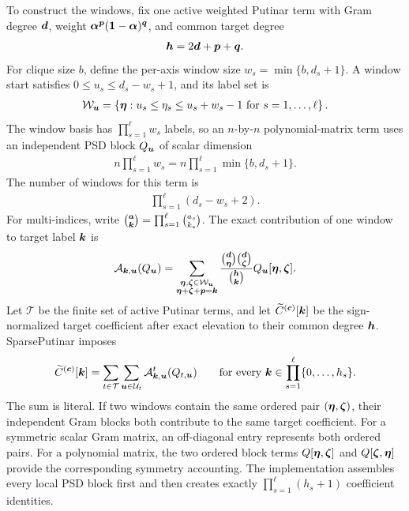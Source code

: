 To construct the windows, fix one active weighted Putinar term with Gram degree $\boldsymbol{d}$, weight $\boldsymbol{\alpha}^{\boldsymbol{p}}(\boldsymbol{1}-\boldsymbol{\alpha})^{\boldsymbol{q}}$, and common target degree
\begin{gather*}
  \boldsymbol{h}=2\boldsymbol{d}+\boldsymbol{p}+\boldsymbol{q}.
\end{gather*}
For clique size $b$, define the per-axis window size $w_s=\min\{b,d_s+1\}$. A window start satisfies $0\le u_s\le d_s-w_s+1$, and its label set is
\begin{gather*}
  \mathcal W_{\boldsymbol{u}}
  =\left\{\boldsymbol{\eta}:
  u_s\le\eta_s\le u_s+w_s-1
  \text{ for }s=1,\ldots,\ell\right\}.
\end{gather*}
The window basis has $\prod_{s=1}^{\ell} w_s$ labels, so an $n$-by-$n$ polynomial-matrix term uses an independent PSD block $Q_{\boldsymbol{u}}$ of scalar dimension
\begin{gather*}
  n\prod_{s=1}^{\ell}w_s
  =n\prod_{s=1}^{\ell}\min\{b,d_s+1\}.
\end{gather*}
The number of windows for this term is
\begin{gather*}
  \prod_{s=1}^{\ell}(d_s-w_s+2).
\end{gather*}
For multi-indices, write $\binom{\boldsymbol{a}}{\boldsymbol{k}}=\prod_{s=1}^{\ell}\binom{a_s}{k_s}$. The exact contribution of one window to target label $\boldsymbol{k}$ is
\begin{gather*}
  \mathcal A_{\boldsymbol{k},\boldsymbol{u}}(Q_{\boldsymbol{u}})
  =\sum_{\substack{\boldsymbol{\eta},\boldsymbol{\zeta}\in\mathcal W_{\boldsymbol{u}}\\
                    \boldsymbol{\eta}+\boldsymbol{\zeta}+\boldsymbol{p}=\boldsymbol{k}}}
  \frac{\binom{\boldsymbol{d}}{\boldsymbol{\eta}}\binom{\boldsymbol{d}}{\boldsymbol{\zeta}}}
       {\binom{\boldsymbol{h}}{\boldsymbol{k}}}
  Q_{\boldsymbol{u}}[\boldsymbol{\eta},\boldsymbol{\zeta}].
\end{gather*}
Let $\mathcal T$ be the finite set of active Putinar terms, and let $\widetilde C^{(\boldsymbol{c})}[\boldsymbol{k}]$ be the sign-normalized target coefficient after exact elevation to their common degree $\boldsymbol{h}$. SparsePutinar imposes
\begin{gather*}
  \widetilde C^{(\boldsymbol{c})}[\boldsymbol{k}]
  =\sum_{t\in\mathcal T}\sum_{\boldsymbol{u}\in\mathcal U_t}
    \mathcal A^{t}_{\boldsymbol{k},\boldsymbol{u}}(Q_{t,\boldsymbol{u}})
  \qquad
  \text{for every }\boldsymbol{k}\in\prod_{s=1}^{\ell}\{0,\ldots,h_s\}.
\end{gather*}
The sum is literal. If two windows contain the same ordered pair $(\boldsymbol{\eta},\boldsymbol{\zeta})$, their independent Gram blocks both contribute to the same target coefficient. For a symmetric scalar Gram matrix, an off-diagonal entry represents both ordered pairs. For a polynomial matrix, the two ordered block terms $Q[\boldsymbol{\eta},\boldsymbol{\zeta}]$ and $Q[\boldsymbol{\zeta},\boldsymbol{\eta}]$ provide the corresponding symmetry accounting. The implementation assembles every local PSD block first and then creates exactly $\prod_{s=1}^{\ell}(h_s+1)$ coefficient identities.

